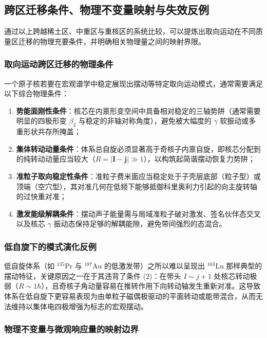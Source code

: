 \subsection{跨区迁移条件、物理不变量映射与失效反例}\label{sec:4-4-5}

通过以上跨越稀土区、中重区与重核区的系统比较，可以提炼出取向运动在不同质量区迁移的物理充要条件，并明确相关物理量之间的映射界限。

\subsubsection{取向运动跨区迁移的物理条件}

一个原子核若要在宏观谱学中稳定展现出摆动等特定取向运动模式，通常需要满足以下综合物理条件：
\begin{enumerate}
\item \textbf{势能面刚性条件}：核芯在内禀形变空间中具备相对稳定的三轴势阱（通常需要明显的四极形变 $\beta_2$ 与稳定的非轴对称角度），避免被大幅度的 $\gamma$ 软振动或多重形状共存所掩盖；
\item \textbf{集体转动动量条件}：体系总自旋必须显著高于奇核子内禀自旋，即核芯分配到的纯转动动量应当较大（$R = |\mathbf{I} - \mathbf{j}| \gg 1$），以构筑起简谐摆动恢复力势阱；
\item \textbf{准粒子取向稳定性条件}：准粒子费米面应当稳定处于子壳层底部（粒子型）或顶端（空穴型），其对准几何在低频下能够抵御科里奥利力引起的向主旋转轴的过快重对准；
\item \textbf{激发能级解耦条件}：摆动声子能量需与局域准粒子破对激发、签名伙伴态交叉以及核芯 $\gamma$ 振动态保持足够的解耦能隙，避免带间强烈的态混合。
\end{enumerate}

\subsubsection{低自旋下的模式演化反例}

低自旋体系（如 $^{135}\mathrm{Pr}$ 与 $^{187}\mathrm{Au}$ 的低激发带）之所以难以呈现出 $^{163}\mathrm{Lu}$ 那样典型的摆动特征，关键原因之一在于其违背了条件 (2)：在带头 $I \sim j+1$ 处核芯转动极弱（$R \sim 1\hbar$），且奇核子角动量容易在推转作用下向转动轴发生重新对准。这导致体系在低自旋下更容易表现为由单粒子磁偶极驱动的平面转动或能带混合，从而无法维持以集体电四极增强为标志的宏观摆动。

\subsubsection{物理不变量与微观响应量的映射边界}

